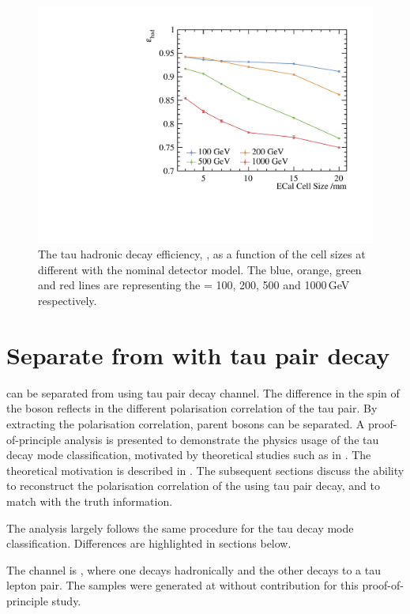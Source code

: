 \begin{figure}[htbp]
\centering %
\includegraphics[width=.45\textwidth]{tau/plots3/hadronicEff.pdf}
\caption[The tau hadronic decay efficiency as a function of  the \ECAL cell sizes at different \sqrtS with the nominal \ILD detector model.]
{The tau hadronic decay efficiency, \tauHad, as a function of  the \ECAL cell sizes at different \sqrtS with the nominal \ILD detector model. The blue, orange, green and red lines are representing the \sqrtS = 100, 200, 500 and 1000\,GeV respectively.}
\label{fig:TauHadronicEfficiency}
\end{figure}


\section{Separate \PHiggs from \PZ with tau pair decay}

\PHiggs can be separated from  \PZ using  tau pair decay channel.  The difference in the spin of the boson reflects in the different polarisation correlation of the tau pair. By extracting the polarisation correlation, parent bosons can be separated. A proof-of-principle analysis is presented to demonstrate the physics usage of the tau decay mode classification, motivated by theoretical studies such as in \cite{Bullock:1991my}. The theoretical motivation is described in . The subsequent sections discuss the ability to reconstruct the polarisation correlation of the \PZ using tau pair decay, and to match with the truth information.

The analysis largely follows the same procedure for the tau decay mode classification. Differences are highlighted in sections below.

The channel is \HepProcess{\Pep \Pem \to \PZ \PZ}, where one \PZ decays hadronically and the other \PZ decays to a tau lepton pair. The samples were generated at  without \ISR contribution for this proof-of-principle study.

